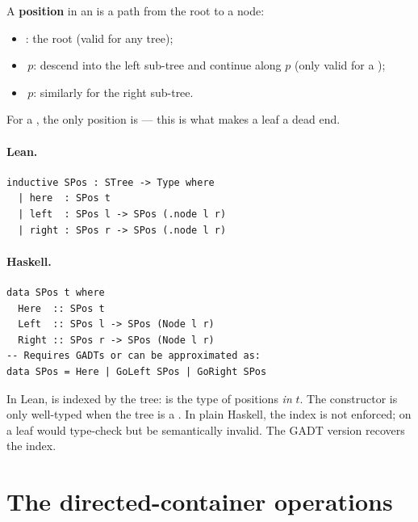 \documentclass[11pt,a4paper]{article}
\begin{document}
\begin{defn}
A \textbf{position} in an  is a path from the root to a node:
\begin{itemize}
  \item {}: the root (valid for any tree);
  \item {}$\,p$: descend into the left sub-tree and continue along $p$
        (only valid for a );
  \item {}$\,p$: similarly for the right sub-tree.
\end{itemize}
For a , the only position is  --- this is what makes a
leaf a dead end.
\end{defn}

\paragraph{Lean.}
\begin{lstlisting}[style=lean]
inductive SPos : STree -> Type where
  | here  : SPos t
  | left  : SPos l -> SPos (.node l r)
  | right : SPos r -> SPos (.node l r)
\end{lstlisting}

\paragraph{Haskell.}
\begin{lstlisting}[style=haskell]
data SPos t where
  Here  :: SPos t
  Left  :: SPos l -> SPos (Node l r)
  Right :: SPos r -> SPos (Node l r)
-- Requires GADTs or can be approximated as:
data SPos = Here | GoLeft SPos | GoRight SPos
\end{lstlisting}

\begin{fidelitynote}
In Lean,  is indexed by the tree:  is the type of
positions \emph{in} $t$.  The  constructor is only well-typed when
the tree is a .  In plain Haskell, the index is not enforced;
 on a leaf would type-check but be semantically invalid.
The GADT version recovers the index.
\end{fidelitynote}


\section{The directed-container operations}
\end{document}
